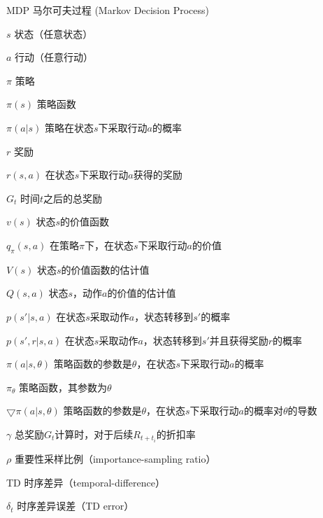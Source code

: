 \begin{denotation}[3cm]
\item[MDP] 马尔可夫过程 (Markov Decision Process)
\item[$s$] 状态（任意状态）
\item[$a$] 行动（任意行动）
\item[$\pi$] 策略
\item[$\pi(s)$] 策略函数
\item[$\pi(a|s)$] 策略在状态$s$下采取行动$a$的概率
\item[$r$] 奖励
\item[$r(s, a)$] 在状态$s$下采取行动$a$获得的奖励
\item[$G_t$] 时间$t$之后的总奖励
\item[$v(s)$] 状态$s$的价值函数
\item[$q_\pi(s, a)$] 在策略$\pi$下，在状态$s$下采取行动$a$的价值
\item[$V(s)$] 状态$s$的价值函数的估计值
\item[$Q(s, a)$] 状态$s$，动作$a$的价值的估计值
\item[$p(s'|s, a)$] 在状态$s$采取动作$a$，状态转移到$s'$的概率
\item[$p(s', r|s, a)$] 在状态$s$采取动作$a$，状态转移到$s'$并且获得奖励$r$的概率
\item[$\pi(a|s, \theta)$] 策略函数的参数是$\theta$，在状态$s$下采取行动$a$的概率
\item[$\pi_\theta$] 策略函数，其参数为$\theta$
\item[$\bigtriangledown \pi(a|s, \theta)$] 策略函数的参数是$\theta$，在状态$s$下采取行动$a$的概率对$\theta$的导数
\item[$\gamma$] 总奖励$G_t$计算时，对于后续$R_{t+t_i}$的折扣率
\item[$\rho$] 重要性采样比例（importance-sampling ratio）
\item[TD] 时序差异（temporal-difference）
\item[$\delta_t$] 时序差异误差（TD error）
\end{denotation}
